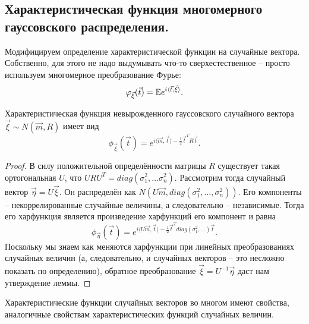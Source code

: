 \subsection{Характеристическая функция многомерного гауссовского распределения.}
\begin{definition}
    Модифицируем определение характеристической функции на случайные вектора.
    Собственно, для этого не надо выдумывать что-то сверхестественное -- просто используем многомерное преобразование Фурье:
    \[
        \varphi_{\vec{\xi}}(\vec{t}) = \mathbb{E} e^{i \langle \vec{t}, \vec{\xi} \rangle}.
    \]
\end{definition}
\begin{lemma}
    Характеристическая функция невырожденного гауссовского случайного вектора $\vec{\xi} \sim N(\vec{m}, R)$ имеет вид
    \[
        \phi_{\vec{\xi}}(\vec{t}) = e^{i \langle \vec{m}, \vec{t} \rangle - \frac{1}{2} \vec{t}^T R \vec{t}}.
    \]
\end{lemma}
\begin{proof}
    В силу положительной определённости матрицы $R$ существует такая ортогональная $U$, что $URU^T = diag(\sigma_1^2, \ldots \sigma_n^2)$.
    Рассмотрим тогда случайный вектор $\vec{\eta} = U\vec{\xi}$.
    Он распределён как $N(U\vec{m}, diag(\sigma_1^2, \ldots, \sigma_n^2))$.
    Его компоненты -- некоррелированные случайные величины, а следовательно -- независимые.
    Тогда его харфункция является произведение харфункций его компонент и равна
    \[
        \phi_{\vec{\eta}}(\vec{t}) = e^{i \langle U\vec{m}, \vec{t} \rangle- \frac{1}{2} \vec{t}^T diag(\sigma_1^2, \ldots) \vec{t}}.
    \]
    Поскольку мы знаем как меняются харфункции при линейных преобразованиях случайных величин (а, следовательно, и случайных векторов -- это несложно показать по определению), обратное преобразование $\vec{\xi} = U^{-1}\vec{\eta}$ даст нам утверждение леммы.
\end{proof}
\begin{note}
    Характеристические функции случайных векторов во многом имеют свойства, аналогичные свойствам характеристических функций случайных величин.
\end{note}
